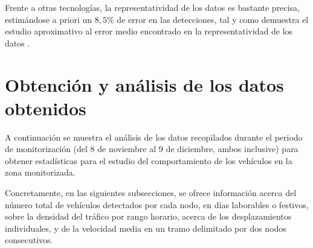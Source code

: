 \documentclass[twocolumn,twoside]{Jornadas}
\begin{document}



Frente a otras tecnologías, la representatividad de los datos es bastante precisa, estimándose a priori un $8,5\%$ de error en las detecciones, tal y como demuestra el estudio aproximativo al error medio encontrado en la representatividad de los datos \cite{estudioprecision}.


\section{Obtención y análisis de los datos obtenidos}
\label{analisis}

A continuación se muestra el análisis de los datos recopilados durante el periodo de monitorización (del 8 de noviembre al 9 de diciembre, ambos inclusive) para obtener estadísticas 
para el estudio del comportamiento de los vehículos en la zona monitorizada.

Concretamente, en las siguientes subsecciones, se ofrece información acerca del número total de vehículos detectados por cada nodo, en días laborables o festivos, sobre la densidad del tráfico por rango horario, acerca de los desplazamientos individuales, y de la velocidad media en un tramo delimitado por dos nodos consecutivos.

\end{document}
